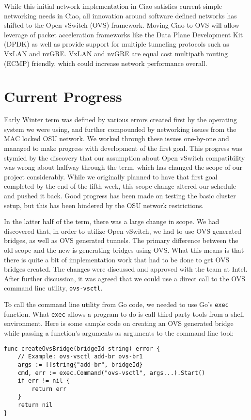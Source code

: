 \documentclass[10pt,onecolumn,journal,draftclsnofoot]{IEEEtran}
\begin{document}
While this initial network implementation in Ciao satisfies current simple
networking needs in Ciao, all innovation around software defined networks has
shifted to the Open vSwitch (OVS) framework. Moving Ciao to OVS will allow
leverage of packet acceleration frameworks like the Data Plane Development Kit
(DPDK) as well as provide support for multiple tunneling protocols such as VxLAN
and nvGRE. VxLAN and nvGRE are equal cost multipath routing (ECMP) friendly,
which could increase network performance overall.

\section{Current Progress}
Early Winter term was defined by various errors created first by the operating
system we were using, and further compounded by networking issues from the MAC
locked OSU network. We worked through these issues one-by-one and managed to
make progress with development of the first goal. This progress was stymied by
the discovery that our assumption about Open vSwitch compatibility was wrong
about halfway through the term, which has changed the scope of our project
considerably. While we originally planned to have that first goal completed by
the end of the fifth week, this scope change altered our schedule and pushed it
back. Good progress has been made on testing the basic cluster setup, but this
has been hindered by the OSU network restrictions. 

In the latter half of the term, there was a large change in scope. We had discovered
that, in order to utilize Open vSwitch, we had to use OVS generated bridges, as
well as OVS generated tunnels. The primary difference between the old scope and
the new is generating bridges using OVS. What this means is that there is quite
a bit of implementation work that had to be done to get OVS bridges created. 
The changes were discussed and approved with the team at Intel. After further
discussion, it was agreed that we could use a direct call to the OVS command
line utility, \texttt{ovs-vsctl}. 

To call the command line utility from Go code, we needed to use Go's \texttt{exec}
function. What \texttt{exec} allows a program to do is call third party tools
from a shell environment. Here is some sample code on creating an OVS generated
bridge while passing a function's arguments as arguments to the command line tool:

\begin{lstlisting}[caption=Simple OVS bridge creation function]
func createOvsBridge(bridgeId string) error {
	// Example: ovs-vsctl add-br ovs-br1
	args := []string{"add-br", bridgeId}
	cmd, err := exec.Command("ovs-vsctl", args...).Start()
	if err != nil {
		return err
	}
	return nil
}
\end{lstlisting}
\end{document}
